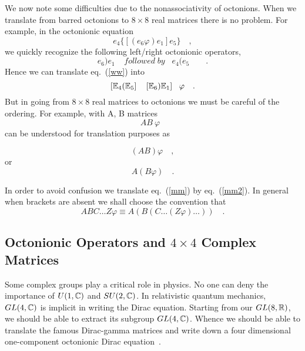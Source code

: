 \documentclass[a4paper,12pt]{book}
\begin{document}
We now note some difficulties due to the nonassociativity of octonions. When
we translate from barred octonions to $8\times 8$ real matrices there is no
problem. For example, in the octonionic equation 
\begin{equation}
e_{4}\{[(e_{6}\varphi )e_{1}]e_{5}\}\quad ,  \label{ww}
\end{equation}
we quickly recognize the following left/right octonionic operators, 
\[
e_{6}\mathbf{)}e_{1}\;\;\;\;followed\;by\;\;\;e_{4}\mathbf{(}e_{5}\quad
\quad . 
\]
Hence we can translate eq.~(\ref{ww}) into 
\begin{equation}
\left[ \Bbb{E}_{4}\mathbf{(}\Bbb{E}_{5}\right] \quad \left[ \Bbb{E}_{6}%
\mathbf{)}\Bbb{E}_{1}\right] ~~\varphi \quad .
\end{equation}
But in going from $8\times 8$ real matrices to octonions we must be careful
of the ordering. For example, with A, B matrices 
\begin{equation}
AB~\varphi ~~~  \label{mm}
\end{equation}
can be understood for translation purposes as

\begin{equation}  \label{mm1}
(AB) \varphi \quad ,
\end{equation}
or 
\begin{equation}  \label{mm2}
A (B \varphi) \quad .
\end{equation}

In order to avoid confusion we translate eq.~(\ref{mm}) by eq.~(\ref{mm2}).
In general when brackets are absent we shall choose the convention that 
\begin{equation}
ABC\ldots Z\varphi \equiv A(B(C\ldots (Z\varphi )\ldots ))\quad .
\end{equation}

\subsection{Octonionic Operators and $4\times 4$ Complex Matrices}

Some complex groups play a critical role in physics. No one can deny the
importance of $U(1,\Bbb{C})$ and $SU(2,\Bbb{C})$. In relativistic quantum
mechanics, $GL(4,\Bbb{C})$ is implicit in writing the Dirac equation.
Starting from our $GL(8,\Bbb{R})$, we should be able to extract its subgroup 
$GL(4,\Bbb{C})$. Whence we should be able to translate the famous
Dirac-gamma matrices and write down a four dimensional one-component
octonionic Dirac equation~\cite{odir}.
\end{document}
